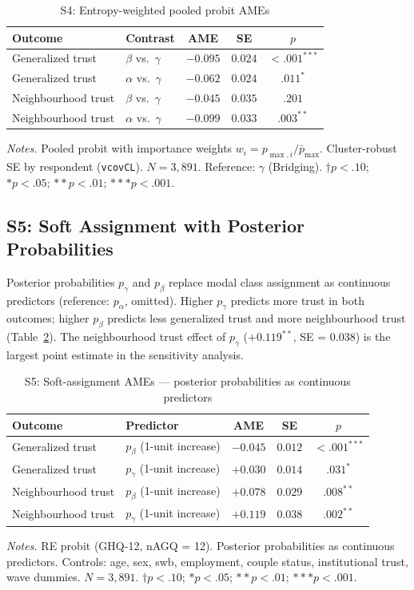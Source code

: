 \documentclass[12pt, a4paper]{article}
\newcommand{\tablenote}[1]{\vspace{4pt}\par\footnotesize\textit{Notes.} #1}
\begin{document}
\begin{table}[H]
\centering
\caption{S4: Entropy-weighted pooled probit AMEs}
\label{tab:A14_entropy}
\small
\begin{tabular}{llccc}
\hline\hline
  Outcome & Contrast & AME & SE & $p$ \\
\hline
  Generalized trust   & $\beta$ vs.\ $\gamma$ & $-0.095$ & $0.024$ & $<.001^{***}$ \\
  Generalized trust   & $\alpha$ vs.\ $\gamma$ & $-0.062$ & $0.024$ & $.011^{*}$ \\
  Neighbourhood trust & $\beta$ vs.\ $\gamma$ & $-0.045$ & $0.035$ & $.201$ \\
  Neighbourhood trust & $\alpha$ vs.\ $\gamma$ & $-0.099$ & $0.033$ & $.003^{**}$ \\
\hline\hline
\end{tabular}
\tablenote{Pooled probit with importance weights $w_i = p_{\max,i}/\bar{p}_{\max}$.
Cluster-robust SE by respondent (\texttt{vcovCL}). $N = 3{,}891$.
Reference: $\gamma$ (Bridging).
$\dagger p<.10$; $* p<.05$; $** p<.01$; $*** p<.001$.}
\end{table}

\subsection{S5: Soft Assignment with Posterior Probabilities}
\label{sec:s5}

Posterior probabilities $p_{\gamma}$ and $p_{\beta}$ replace modal class
assignment as continuous predictors (reference: $p_{\alpha}$, omitted).
Higher $p_{\gamma}$ predicts more trust in both outcomes; higher $p_{\beta}$
predicts less generalized trust and more neighbourhood trust
(Table~\ref{tab:A15_soft}). The neighbourhood trust effect of $p_{\gamma}$
($+0.119^{**}$, SE = 0.038) is the largest point estimate in the sensitivity
analysis.

\begin{table}[H]
\centering
\caption{S5: Soft-assignment AMEs --- posterior probabilities as continuous predictors}
\label{tab:A15_soft}
\small
\begin{tabular}{llccc}
\hline\hline
  Outcome & Predictor & AME & SE & $p$ \\
\hline
  Generalized trust   & $p_{\beta}$ (1-unit increase)  & $-0.045$ & $0.012$ & $<.001^{***}$ \\
  Generalized trust   & $p_{\gamma}$ (1-unit increase) & $+0.030$ & $0.014$ & $.031^{*}$ \\
  Neighbourhood trust & $p_{\beta}$ (1-unit increase)  & $+0.078$ & $0.029$ & $.008^{**}$ \\
  Neighbourhood trust & $p_{\gamma}$ (1-unit increase) & $+0.119$ & $0.038$ & $.002^{**}$ \\
\hline\hline
\end{tabular}
\tablenote{RE probit (GHQ-12, nAGQ = 12). Posterior probabilities as
continuous predictors. Controls: age, sex, swb, employment, couple status,
institutional trust, wave dummies. $N = 3{,}891$.
$\dagger p<.10$; $* p<.05$; $** p<.01$; $*** p<.001$.}
\end{table}
\end{document}
